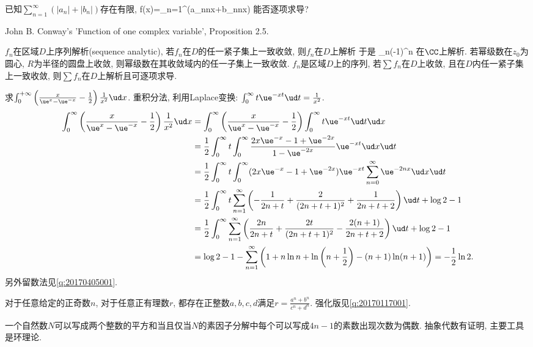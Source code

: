 已知$\sum_{n=1}^{\infty}(|a_n|+|b_n|)$存在有限, 
\bee
f(x)=\sum_{n=1}^{\infty}(a_n\cos nx+b_n\sin nx)
\eee
能否逐项求导?
\eu

John B. Conway's 'Function of one complex variable', Proposition 2.5.
\eu

\bt{}{}
$f_n$在区域$D$上序列解析(sequence analytic), 若$f_n$在$D$的任一紧子集上一致收敛, 
则$f_n$在$D$上解析
\et
于是
\bee
\sum_{n}(-1)^n
\eee
在$\CC$上解析.
\bc{}{}
若幂级数在$z_0$为圆心, $R$为半径的圆盘上收敛, 则幂级数在其收敛域内的任一子集上一致收敛.
\ec
\bt{}{}
$f_n$是区域$D$上的序列, 若$\sum f_n$在$D$上收敛, 且在$D$内任一紧子集上一致收敛, 
则$\sum f_n$在$D$上解析且可逐项求导.
\et
\eu

求$\int_0^{+\infty}\left(\frac{x}{\ue^x-\ue^{-x}}-\frac12\right)\frac1{x^2}\ud x$.
\eu
\ba
重积分法, 利用Laplace变换: $\int_0^{\infty}t\ue^{-xt}\ud t=\frac{1}{x^2}$.
\begin{align*}
 \int_{0}^{\infty}\left(\frac{x}{\ue^x-\ue^{-x}}-\frac{1}{2}\right)\frac{1}{x^2}\ud x
  & = \int_0^{\infty}\left(\frac{x}{\ue^x-\ue^{-x}}-\frac{1}{2}\right)\int_{0}^{\infty}t\ue^{-xt}\ud t\ud x\\
  & =\frac{1}{2}\int_{0}^{\infty}t\int_{0}^{\infty}\frac{2x\ue^{-x}-1+\ue^{-2x}}{1-\ue^{-2x}}\ue^{-xt}\ud x\ud t\\
  & = \frac{1}{2}\int_0^{\infty}t\int_0^{\infty}(2x\ue^{-x}-1+\ue^{-2x})\ue^{-xt}\sum_{n=0}^{\infty}\ue^{-2nx}\ud x\ud t\\
  & = \frac{1}{2}\int_0^{\infty}t\sum_{n=1}^{\infty}\left(-\frac{1}{2n+t}+\frac{2}{(2n+t+1)^2}+\frac{1}{2n+t+2}\right)\ud t+\log 2-1\\
  & = \frac{1}{2}\int_0^{\infty}\sum_{n=1}^{\infty}\left(\frac{2n}{2n+t}+\frac{2t}{(2n+t+1)^2}-\frac{2(n+1)}{2n+t+2}\right)\ud t + \log 2 -1\\
  & = \log 2-1-\sum_{n=1}^{\infty}\left(1+n\ln n+\ln\left(n+\frac12\right)-(n+1)\ln(n+1)\right)=-\frac12\ln 2.
\end{align*}
另外留数法见\ref{q:20170405001}.
\ea

对于任意给定的正奇数$n$, 对于任意正有理数$r$, 都存在正整数$a,b,c,d$满足$r=\frac{a^n+b^n}{c^n+d^n}$. 强化版见\ref{q:20170117001}.
\eu

一个自然数$N$可以写成两个整数的平方和当且仅当$N$的素因子分解中每个可以写成$4n-1$的素数出现次数为偶数.
\eu
\ba
抽象代数有证明, 主要工具是环理论.
\ea

